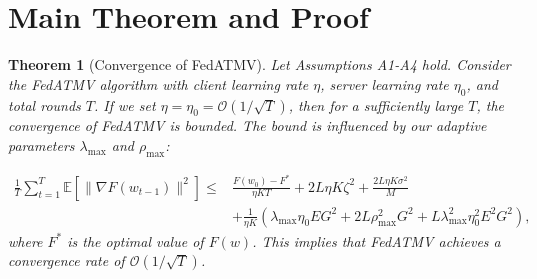 \documentclass[11pt]{article}
\begin{document}
\section{Main Theorem and Proof}

\newtheorem{theorem}{Theorem}
\begin{theorem}[Convergence of FedATMV]
\label{thm:convergence-full}
Let Assumptions A1-A4 hold. Consider the FedATMV algorithm with client learning rate $\eta$, server learning rate $\eta_0$, and total rounds $T$. If we set $\eta = \eta_0 = \mathcal{O}(1/\sqrt{T})$, then for a sufficiently large $T$, the convergence of FedATMV is bounded. The bound is influenced by our adaptive parameters $\lambda_{\max}$ and $\rho_{\max}$:


\begin{align}
    \frac{1}{T} \sum_{t=1}^{T} \mathbb{E}[\|\nabla F(w_{t-1})\|^2] \le & \frac{F(w_0) - F^*}{\eta K T} + 2L\eta K \zeta^2 + \frac{2L\eta K \sigma^2}{M} \nonumber \\
    & + \frac{1}{\eta K} \left( \lambda_{\max}\eta_0 E G^2 + 2L\rho_{\max}^2 G^2 + L\lambda_{\max}^2 \eta_0^2 E^2 G^2 \right),
\end{align}
where $F^*$ is the optimal value of $F(w)$. This implies that FedATMV achieves a convergence rate of $\mathcal{O}(1/\sqrt{T})$.
\end{theorem}
\end{document}
